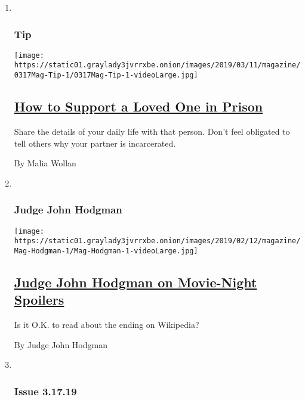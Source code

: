 \begin{enumerate}
\def\labelenumi{\arabic{enumi}.}
\item ~
  \hypertarget{tip}{%
  \subsubsection{Tip}\label{tip}}

  \texttt{[image: https://static01.graylady3jvrrxbe.onion/images/2019/03/11/magazine/0317Mag-Tip-1/0317Mag-Tip-1-videoLarge.jpg]}

  \hypertarget{how-to-support-a-loved-one-in-prison}{%
  \subsection{\texorpdfstring{\href{/2019/03/12/magazine/how-to-support-a-loved-one-in-prison.html}{How
  to Support a Loved One in
  Prison}}{How to Support a Loved One in Prison}}\label{how-to-support-a-loved-one-in-prison}}

  Share the details of your daily life with that person. Don't feel
  obligated to tell others why your partner is incarcerated.

  By Malia Wollan
\item ~
  \hypertarget{judge-john-hodgman}{%
  \subsubsection{Judge John Hodgman}\label{judge-john-hodgman}}

  \texttt{[image: https://static01.graylady3jvrrxbe.onion/images/2019/02/12/magazine/Mag-Hodgman-1/Mag-Hodgman-1-videoLarge.jpg]}

  \hypertarget{judge-john-hodgman-on-movie-night-spoilers}{%
  \subsection{\texorpdfstring{\href{/2019/03/14/magazine/judge-john-hodgman-on-movie-night-spoilers.html}{Judge
  John Hodgman on Movie-Night
  Spoilers}}{Judge John Hodgman on Movie-Night Spoilers}}\label{judge-john-hodgman-on-movie-night-spoilers}}

  Is it O.K. to read about the ending on Wikipedia?

  By Judge John Hodgman
\item ~
  \hypertarget{issue-31719}{%
  \subsubsection{Issue 3.17.19}\label{issue-31719}}


\end{enumerate}
